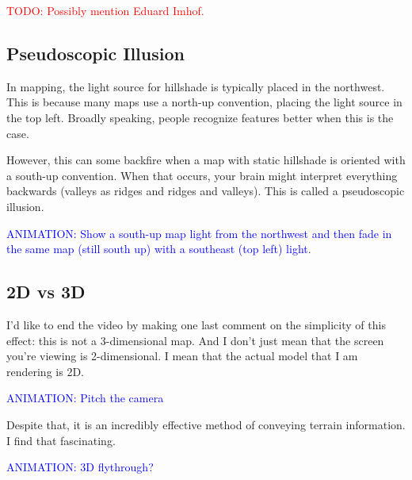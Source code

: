 \documentclass{article}
\newcommand\todo[1]{\textcolor{red}{TODO: #1}}
\newcommand\animation[1]{\textcolor{blue}{ANIMATION: #1}}
\begin{document}
\todo{Possibly mention Eduard Imhof.}

\subsection{Pseudoscopic Illusion}

In mapping, the light source for hillshade is typically placed in the northwest.
This is because many maps use a north-up convention, placing the light source in the top left.
Broadly speaking, people recognize features better when this is the case.

However, this can some backfire when a map with static hillshade is oriented with a south-up convention.
When that occurs, your brain might interpret everything backwards (valleys as ridges and ridges and valleys).
This is called a pseudoscopic illusion.

\animation{Show a south-up map light from the northwest and then fade in the same map (still south up) with a southeast (top left) light}.

\subsection{2D vs 3D}

I'd like to end the video by making one last comment on the simplicity of this effect: this is not a 3-dimensional map.
And I don't just mean that the screen you're viewing is 2-dimensional.
I mean that the actual model that I am rendering is 2D.

\animation{Pitch the camera}

Despite that, it is an incredibly effective method of conveying terrain information.
I find that fascinating.

\animation{3D flythrough?}
\end{document}
